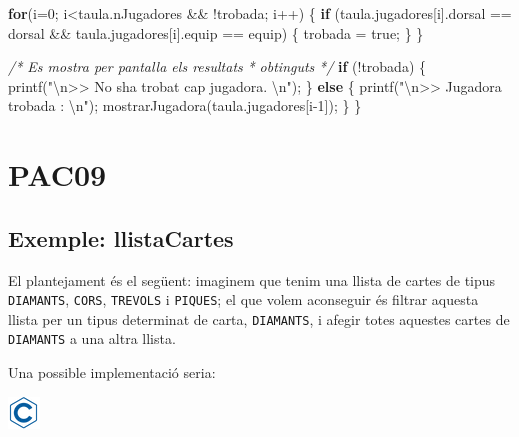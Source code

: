 \documentclass[
]{book}
\newenvironment{Shaded}{\begin{snugshade}}{\end{snugshade}}
\newcommand{\CommentTok}[1]{\textcolor[rgb]{0.56,0.35,0.01}{\textit{#1}}}
\newcommand{\ControlFlowTok}[1]{\textcolor[rgb]{0.13,0.29,0.53}{\textbf{#1}}}
\newcommand{\DecValTok}[1]{\textcolor[rgb]{0.00,0.00,0.81}{#1}}
\newcommand{\NormalTok}[1]{#1}
\newcommand{\SpecialCharTok}[1]{\textcolor[rgb]{0.00,0.00,0.00}{#1}}
\newcommand{\StringTok}[1]{\textcolor[rgb]{0.31,0.60,0.02}{#1}}
\begin{document}
\begin{Shaded}
\begin{Highlighting}[]
    \ControlFlowTok{for}\NormalTok{(i=}\DecValTok{0}\NormalTok{; i\textless{}taula.nJugadores \&\& !trobada; i++) \{}
        \ControlFlowTok{if}\NormalTok{ (taula.jugadores[i].dorsal == dorsal \&\&}
\NormalTok{            taula.jugadores[i].equip == equip) \{}
\NormalTok{                trobada = true;}
\NormalTok{        \}}
\NormalTok{    \}}
    
    \CommentTok{/* Es mostra per pantalla els resultats}
\CommentTok{     * obtinguts }
\CommentTok{     */}
    \ControlFlowTok{if}\NormalTok{ (!trobada) \{}
\NormalTok{        printf(}\StringTok{"}\SpecialCharTok{\textbackslash{}n}\StringTok{\textgreater{}\textgreater{} No s\textquotesingle{}ha trobat cap jugadora. }\SpecialCharTok{\textbackslash{}n}\StringTok{"}\NormalTok{);}
\NormalTok{    \} }\ControlFlowTok{else}\NormalTok{ \{}
\NormalTok{        printf(}\StringTok{"}\SpecialCharTok{\textbackslash{}n}\StringTok{\textgreater{}\textgreater{} Jugadora trobada : }\SpecialCharTok{\textbackslash{}n}\StringTok{"}\NormalTok{);}
\NormalTok{        mostrarJugadora(taula.jugadores[i{-}}\DecValTok{1}\NormalTok{]);}
\NormalTok{    \}}
\NormalTok{\}}
\end{Highlighting}
\end{Shaded}

\hypertarget{pac09}{%
\chapter{PAC09}\label{pac09}}

\hypertarget{exemple-llistacartes}{%
\section{Exemple: llistaCartes}\label{exemple-llistacartes}}

El plantejament és el següent: imaginem que tenim una llista de cartes de tipus \texttt{DIAMANTS}, \texttt{CORS}, \texttt{TREVOLS} i \texttt{PIQUES}; el que volem aconseguir és filtrar aquesta llista per un tipus determinat de carta, \texttt{DIAMANTS}, i afegir totes aquestes cartes de \texttt{DIAMANTS} a una altra llista.

Una possible implementació seria:

\includegraphics{./img/c.png}
\end{document}
